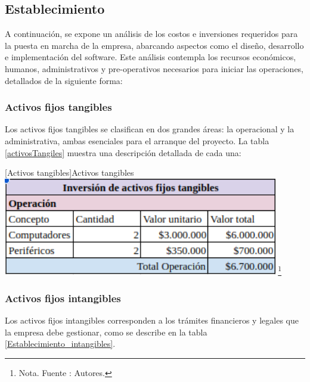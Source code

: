 \subsection{Establecimiento}

A continuación, se expone un análisis de los costos e inversiones requeridos para la puesta en marcha de la empresa, abarcando aspectos como el diseño, desarrollo e implementación del software. Este análisis contempla los recursos económicos, humanos, administrativos y pre-operativos necesarios para iniciar las operaciones, detallados de la siguiente forma:

\subsubsection{Activos fijos tangibles}

Los activos fijos tangibles se clasifican en dos grandes áreas: la operacional y la administrativa, ambas esenciales para el arranque del proyecto. La tabla \ref{activosTangiles} muestra una descripción detallada de cada una:

    \vspace{2mm}
        \begin{minipage}{0.9\textwidth}
        \centering
        [{Activos tangibles}]{Activos tangibles}
        \label{activosTangiles}
        \includegraphics[width=0.9\textwidth]{Content/Images/AF/Establecimiento_tangibles.png}
        \footnote{Nota. \textup{Fuente : Autores.}}
        \end{minipage}

\subsubsection{Activos fijos intangibles}

Los activos fijos intangibles corresponden a los trámites financieros y legales que la empresa debe gestionar, como se describe en la tabla \ref{Establecimiento_intangibles}.

